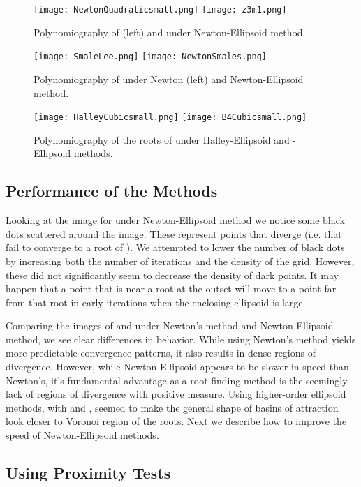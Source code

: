 \documentclass{article}
\begin{document}
\begin{figure}[h!]
\centering
\texttt{[image: NewtonQuadraticsmall.png]}
\texttt{[image: z3m1.png]}
\caption{Polynomiography of  (left) and  under Newton-Ellipsoid method.} \label{Newton-Ellipsoid}
\end{figure}


\begin{figure}[h!]
\centering
\texttt{[image: SmaleLee.png]}
\texttt{[image: NewtonSmales.png]}
\caption{Polynomiography of  under Newton (left) and Newton-Ellipsoid method.} \label{NE-Smale}
\end{figure}


\begin{figure}[h!]
\centering
\texttt{[image: HalleyCubicsmall.png]}
\texttt{[image: B4Cubicsmall.png]}
\caption{Polynomiography of the roots of  under Halley-Ellipsoid and -Ellipsoid methods.} \label{HE-B4E}
\end{figure}


\subsection{Performance of the Methods}
Looking at the image for  under Newton-Ellipsoid method we notice some black dots scattered around the image. These represent points that diverge (i.e. that fail to converge to a root of ). We attempted to lower the number of black dots by increasing both the number of iterations and the density of the grid. However, these did not significantly seem to decrease the density of dark points. It may happen that a point  that is near a root at the outset will move to a point far from that root in early iterations when the enclosing ellipsoid is large.

Comparing the images of  and  under Newton's method and Newton-Ellipsoid method, we see clear differences in behavior. While using Newton's method yields more predictable convergence patterns, it also results in dense regions of divergence. However, while Newton Ellipsoid appears to be slower in speed than Newton's, it's fundamental advantage as a root-finding method is the seemingly lack of regions of divergence with positive measure. Using higher-order ellipsoid methods, with  and , seemed to make the general shape of basins of attraction look closer to Voronoi region of the roots. Next we describe how to improve the speed of Newton-Ellipsoid methods.

\subsection{Using Proximity Tests}
\end{document}
